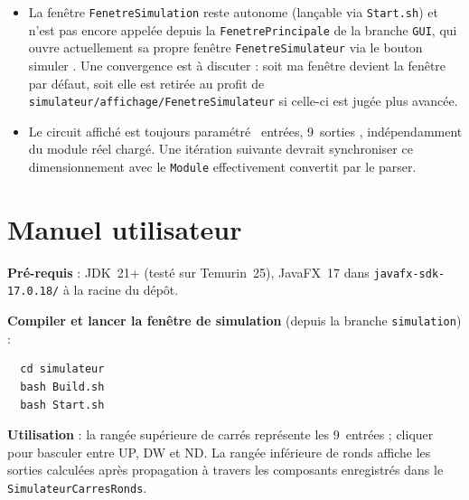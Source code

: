 \documentclass[11pt,a4paper]{article}
\begin{document}
\begin{itemize}
  \item La fen\^etre \texttt{FenetreSimulation} reste autonome (lan\c{c}able via \texttt{Start.sh}) et n'est pas encore appel\'ee depuis la \texttt{FenetrePrincipale} de la branche \texttt{GUI}, qui ouvre actuellement sa propre fen\^etre \texttt{FenetreSimulateur} via le bouton \og simuler \fg{}. Une convergence est \`a discuter : soit ma fen\^etre devient la fen\^etre par d\'efaut, soit elle est retir\'ee au profit de \texttt{simulateur/affichage/FenetreSimulateur} si celle-ci est jug\'ee plus avanc\'ee.
  \item Le circuit affich\'e est toujours param\'etr\'e ~entr\'ees, 9~sorties \fg{}, ind\'epen\-damment du module r\'eel charg\'e. Une it\'eration suivante devrait synchroniser ce dimensionnement avec le \texttt{Module} effectivement convertit par le parser.
\end{itemize}

\section*{Manuel utilisateur}

\textbf{Pr\'e-requis} : JDK~21+ (testé sur Temurin~25), JavaFX~17 dans \texttt{javafx-sdk-17.0.18/} \`a la racine du d\'ep\^ot.

\textbf{Compiler et lancer la fen\^etre de simulation} (depuis la branche \texttt{simulation}) :
\begin{verbatim}
  cd simulateur
  bash Build.sh
  bash Start.sh
\end{verbatim}

\textbf{Utilisation} : la rang\'ee sup\'erieure de carr\'es repr\'esente les 9~entr\'ees ; cliquer pour basculer entre UP, DW et ND. La rang\'ee inf\'erieure de ronds affiche les sorties calcul\'ees apr\`es propagation \`a travers les composants enregistr\'es dans le \texttt{SimulateurCarresRonds}.
\end{document}
